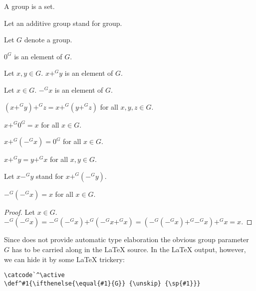 \documentclass[11pt]{article}
\begin{document}
\begin{forthel}
\begin{signature} A group is a set. \end{signature}

Let an additive group stand for group.

Let $G$ denote a group.

\begin{signature} $0^{G}$ is an element of $G$.
\end{signature}

\begin{signature} Let $x,y \in G$. $x +^{G} y$ is an element of $G$. \end{signature}

\begin{signature} Let $x \in G$. $-^{G} x$ is an element of $G$. \end{signature}

\begin{axiom}[id = Associativity, title = Associativity] $(x +^{G} y) +^{G} z = x +^{G} (y +^{G} z)$ for all $x,y,z \in G$.
\end{axiom} 
\begin{axiom} $x +^{G} 0^{G} = x$ for all $x \in G$.
\end{axiom}
\begin{axiom} $x +^{G} (-^{G} x) = 0^{G}$ for all $x \in G$.
\end{axiom}
\begin{axiom} $x +^{G} y = y +^{G} x$ for all $x,y \in G$.
\end{axiom}

Let $x -^{G} y$ stand for $x +^{G} (-^{G} y)$.

\begin{lemma}
$ -^{G} (-^{G} x) = x$ for all $x \in G$.
\end{lemma}
\begin{proof}
Let $x \in G$.
$ -^{G} (-^{G} x) =  -^{G} (-^{G} x) +^{G} (-^{G} x +^{G} x)
=  (-^{G} (-^{G} x) +^{G} -^{G} x) +^{G} x = x$.
\end{proof}
\end{forthel}
Since \Naproche does not provide automatic type elaboration the obvious 
group parameter $G$ has to be carried along in the \LaTeX{} source.
In the \LaTeX{} output, however, we can hide it by 
some \LaTeX{} trickery:
\begin{verbatim}
\catcode`^\active
\def^#1{\ifthenelse{\equal{#1}{G}} {\unskip} {\sp{#1}}}
\end{verbatim}
\end{document}

